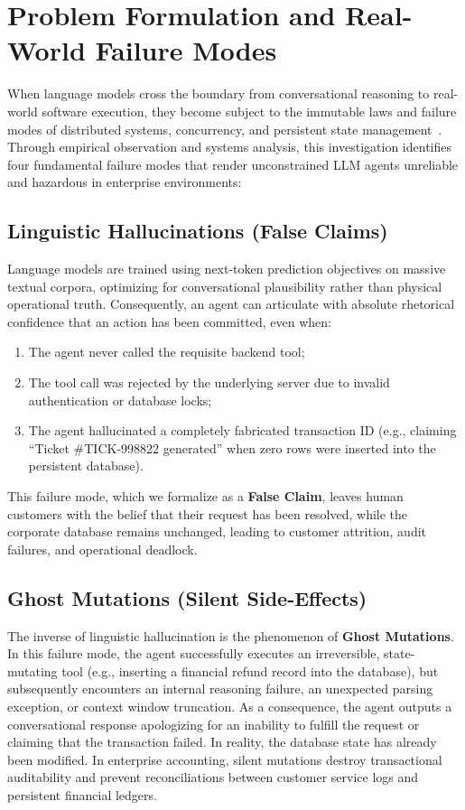 \section{Problem Formulation and Real-World Failure Modes}
\label{sec:intro_problem}
When language models cross the boundary from conversational reasoning to real-world software execution, they become subject to the immutable laws and failure modes of distributed systems, concurrency, and persistent state management~\cite{tanenbaum2007distributed}. Through empirical observation and systems analysis, this investigation identifies four fundamental failure modes that render unconstrained LLM agents unreliable and hazardous in enterprise environments:

\subsection{Linguistic Hallucinations (False Claims)}
Language models are trained using next-token prediction objectives on massive textual corpora, optimizing for conversational plausibility rather than physical operational truth. Consequently, an agent can articulate with absolute rhetorical confidence that an action has been committed, even when:
\begin{enumerate}
    \item The agent never called the requisite backend tool;
    \item The tool call was rejected by the underlying server due to invalid authentication or database locks;
    \item The agent hallucinated a completely fabricated transaction ID (e.g., claiming ``Ticket \#TICK-998822 generated'' when zero rows were inserted into the persistent database).
\end{enumerate}
This failure mode, which we formalize as a \textbf{False Claim}, leaves human customers with the belief that their request has been resolved, while the corporate database remains unchanged, leading to customer attrition, audit failures, and operational deadlock.

\subsection{Ghost Mutations (Silent Side-Effects)}
The inverse of linguistic hallucination is the phenomenon of \textbf{Ghost Mutations}. In this failure mode, the agent successfully executes an irreversible, state-mutating tool (e.g., inserting a financial refund record into the database), but subsequently encounters an internal reasoning failure, an unexpected parsing exception, or context window truncation. As a consequence, the agent outputs a conversational response apologizing for an inability to fulfill the request or claiming that the transaction failed. In reality, the database state has already been modified. In enterprise accounting, silent mutations destroy transactional auditability and prevent reconciliations between customer service logs and persistent financial ledgers.

